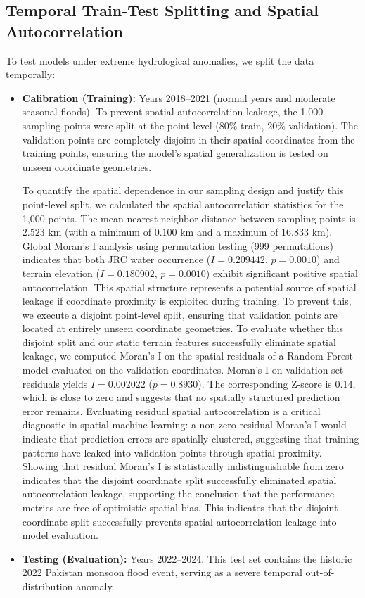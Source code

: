 \documentclass[12pt, a4paper]{article}
\begin{document}
\subsection{Temporal Train-Test Splitting and Spatial Autocorrelation}
To test models under extreme hydrological anomalies, we split the data temporally:
\begin{itemize}
    \item \textbf{Calibration (Training):} Years 2018--2021 (normal years and moderate seasonal floods). To prevent spatial autocorrelation leakage, the 1,000 sampling points were split at the point level ($80\%$ train, $20\%$ validation). The validation points are completely disjoint in their spatial coordinates from the training points, ensuring the model's spatial generalization is tested on unseen coordinate geometries.
    
    To quantify the spatial dependence in our sampling design and justify this point-level split, we calculated the spatial autocorrelation statistics for the 1,000 points. The mean nearest-neighbor distance between sampling points is $2.523\text{ km}$ (with a minimum of $0.100\text{ km}$ and a maximum of $16.833\text{ km}$). Global Moran's I analysis using permutation testing (999 permutations) indicates that both JRC water occurrence ($I = 0.209442$, $p = 0.0010$) and terrain elevation ($I = 0.180902$, $p = 0.0010$) exhibit significant positive spatial autocorrelation. This spatial structure represents a potential source of spatial leakage if coordinate proximity is exploited during training. To prevent this, we execute a disjoint point-level split, ensuring that validation points are located at entirely unseen coordinate geometries. To evaluate whether this disjoint split and our static terrain features successfully eliminate spatial leakage, we computed Moran's I on the spatial residuals of a Random Forest model evaluated on the validation coordinates. Moran's I on validation-set residuals yields $I = 0.002022$ ($p = 0.8930$). The corresponding Z-score is $0.14$, which is close to zero and suggests that no spatially structured prediction error remains. Evaluating residual spatial autocorrelation is a critical diagnostic in spatial machine learning: a non-zero residual Moran's I would indicate that prediction errors are spatially clustered, suggesting that training patterns have leaked into validation points through spatial proximity. Showing that residual Moran's I is statistically indistinguishable from zero indicates that the disjoint coordinate split successfully eliminated spatial autocorrelation leakage, supporting the conclusion that the performance metrics are free of optimistic spatial bias. This indicates that the disjoint coordinate split successfully prevents spatial autocorrelation leakage into model evaluation.
    \item \textbf{Testing (Evaluation):} Years 2022--2024. This test set contains the historic 2022 Pakistan monsoon flood event, serving as a severe temporal out-of-distribution anomaly.
\end{itemize}
\end{document}
